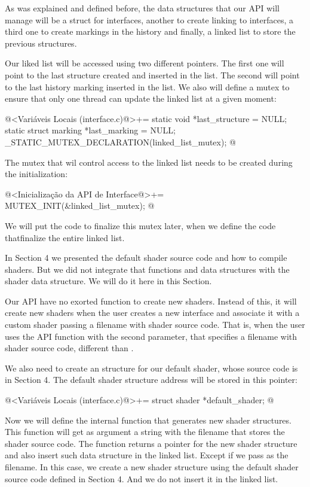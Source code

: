 As was explained and defined before, the data structures that our API
will manage will be a struct for interfaces, another to create linking
to interfaces, a third one to create markings in the history and
finally, a linked list to store the previous structures.

Our liked list will be accessed using two different pointers. The
first one will point to the last structure created and inserted in the
list. The second will point to the last history marking inserted in
the list. We also will define a mutex to ensure that only one thread
can update the linked list at a given moment:

\iniciocodigo
@<Variáveis Locais (interface.c)@>+=
static void *last_structure = NULL;
static struct marking *last_marking = NULL;
_STATIC_MUTEX_DECLARATION(linked_list_mutex);
@
\fimcodigo

The mutex that wil control access to the linked list needs to be
created during the initialization:

\iniciocodigo
@<Inicialização da API de Interface@>+=
MUTEX_INIT(&linked_list_mutex);
@
\fimcodigo

We will put the code to finalize this mutex later, when we define the
code thatfinalize the entire linked list.


In Section 4 we presented the default shader source code and how to
compile shaders. But we did not integrate that functions and data
structures with the shader data structure. We will do it here in this
Section.

Our API have no exorted function to create new shaders. Instead of
this, it will create new shaders when the user creates a new interface
and associate it with a custom shader passing a filename with shader
source code. That is, when the user uses the API
function  with the second parameter,
that specifies a filename with shader source code, different
than .

We also need to create an structure for our default shader, whose
source code is in Section 4. The default shader structure address will
be stored in this pointer:

\iniciocodigo
@<Variáveis Locais (interface.c)@>+=
struct shader *default_shader;
@
\fimcodigo

Now we will define the internal function that generates new shader
structures. This function will get as argument a string with the
filename that stores the shader source code. The function returns a
pointer for the new shader structure and also insert such data
structure in the linked list. Except if we pass  as
the filename. In this case, we create a new shader structure using the
default shader source code defined in Section 4. And we do not insert
it in the linked list.

